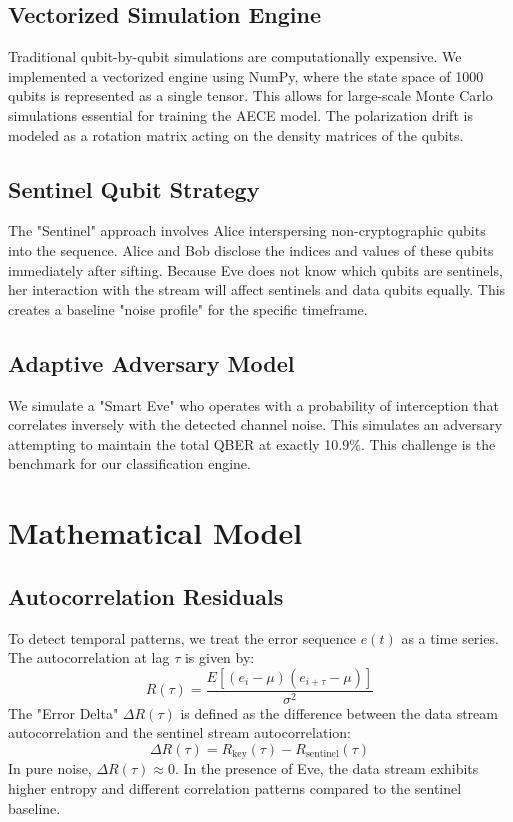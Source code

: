 \documentclass[journal,onecolumn,12pt,draftclsnofoot]{IEEEtran}
\begin{document}
\subsection{Vectorized Simulation Engine}
Traditional qubit-by-qubit simulations are computationally expensive. We implemented a vectorized engine using NumPy, where the state space of 1000 qubits is represented as a single tensor. This allows for large-scale Monte Carlo simulations essential for training the AECE model. The polarization drift is modeled as a rotation matrix acting on the density matrices of the qubits.

\subsection{Sentinel Qubit Strategy}
The "Sentinel" approach involves Alice interspersing non-cryptographic qubits into the sequence. Alice and Bob disclose the indices and values of these qubits immediately after sifting. Because Eve does not know which qubits are sentinels, her interaction with the stream will affect sentinels and data qubits equally. This creates a baseline "noise profile" for the specific timeframe.

\subsection{Adaptive Adversary Model}
We simulate a "Smart Eve" who operates with a probability of interception that correlates inversely with the detected channel noise. This simulates an adversary attempting to maintain the total QBER at exactly 10.9\%. This challenge is the benchmark for our classification engine.

\newpage

\section{Mathematical Model}

\subsection{Autocorrelation Residuals}
To detect temporal patterns, we treat the error sequence $e(t)$ as a time series. The autocorrelation at lag $\tau$ is given by:
\begin{equation}
    R(\tau) = \frac{E[(e_i - \mu)(e_{i+\tau} - \mu)]}{\sigma^2}
\end{equation}
The "Error Delta" $\Delta R(\tau)$ is defined as the difference between the data stream autocorrelation and the sentinel stream autocorrelation:
\begin{equation}
    \Delta R(\tau) = R_{\text{key}}(\tau) - R_{\text{sentinel}}(\tau)
\end{equation}
In pure noise, $\Delta R(\tau) \approx 0$. In the presence of Eve, the data stream exhibits higher entropy and different correlation patterns compared to the sentinel baseline.
\end{document}
